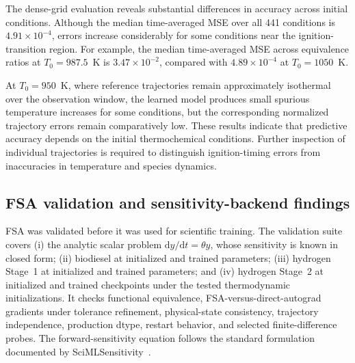 \documentclass[11pt,a4paper]{article}
\newcommand{\dd}{\mathrm{d}}
\begin{document}
The dense-grid evaluation reveals substantial differences
in accuracy across initial conditions. Although the median
time-averaged MSE over all 441 conditions is
$4.91\times10^{-4}$, errors increase considerably for
some conditions near the ignition-transition region.
For example, the median time-averaged MSE across
equivalence ratios at $T_0=987.5$~K is
$3.47\times10^{-2}$, compared with
$4.89\times10^{-4}$ at $T_0=1050$~K.

At $T_0=950$~K, where reference trajectories remain
approximately isothermal over the observation window,
the learned model produces small spurious temperature
increases for some conditions, but the corresponding
normalized trajectory errors remain comparatively low. These results indicate that predictive accuracy depends
on the initial thermochemical conditions. Further
inspection of individual trajectories is required to
distinguish ignition-timing errors from inaccuracies
in temperature and species dynamics.


\subsection{FSA validation and sensitivity-backend findings}

FSA was validated before it was used for scientific training. The validation suite covers (i) the analytic scalar problem $\dd y/\dd t=\theta y$, whose sensitivity is known in closed form; (ii) biodiesel at initialized and trained parameters; (iii) hydrogen Stage~1 at initialized and trained parameters; and (iv) hydrogen Stage~2 at initialized and trained checkpoints under the tested thermodynamic initializations. It checks functional equivalence, FSA-versus-direct-autograd gradients under tolerance refinement, physical-state consistency, trajectory independence, production dtype, restart behavior, and selected finite-difference probes. The forward-sensitivity equation follows the standard formulation documented by SciMLSensitivity~\cite{SciMLSensitivityMath}.
\end{document}
